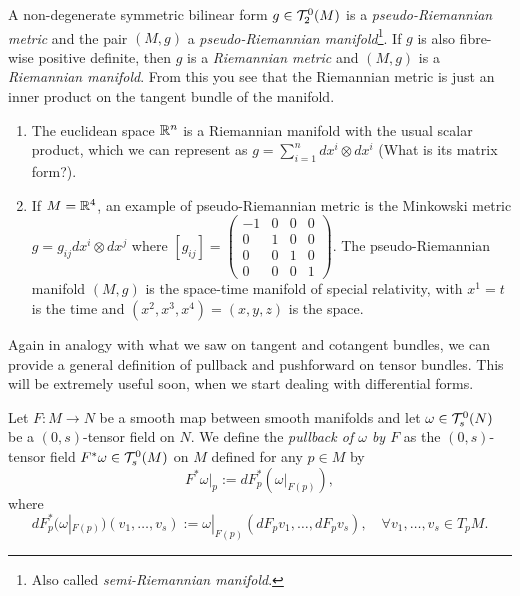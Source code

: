 \begin{example}
  A non-degenerate symmetric bilinear form $g\in \mathcal{T}_2^0(M)$ is a \emph{pseudo-Riemannian metric} and the pair $(M,g)$ a \emph{pseudo-Riemannian manifold}\footnote{Also called \emph{semi-Riemannian manifold}.}.
  If $g$ is also fibre-wise positive definite, then $g$ is a \emph{Riemannian metric} and $(M,g)$ is a \emph{Riemannian manifold}.
  From this you see that the Riemannian metric is just an inner product on the tangent bundle of the manifold.

  \begin{enumerate}
    \item The euclidean space $\mathbb{R}^n$ is a Riemannian manifold with the usual scalar product, which we can represent as $g = \sum_{i=1}^n dx^i\otimes dx^i$ (What is its matrix form?).
    \item If $M=\mathbb{R}^4$, an example of pseudo-Riemannian metric is the Minkowski metric $g = g_{ij} dx^i\otimes dx^j$ where $[g_{ij}] = {\left(\begin{smallmatrix} -1 & 0 & 0 & 0\\ 0 & 1 & 0 & 0 \\ 0 & 0 & 1 & 0 \\ 0 & 0 & 0 & 1 \end{smallmatrix}\right)}$. The pseudo-Riemannian manifold $(M, g)$ is the space-time manifold of special relativity, with $x^1 = t$ is the time and $(x^2, x^3, x^4) = (x,y,z)$ is the space.
  \end{enumerate}
\end{example}

Again in analogy with what we saw on tangent and cotangent bundles, we can provide a general definition of pullback and pushforward on tensor bundles.
This will be extremely useful soon, when we start dealing with differential forms.

\begin{definition}
  Let $F:M\to N$ be a smooth map between smooth manifolds and let $\omega \in \mathcal{T}_s^0(N)$ be a $(0,s)$-tensor field on $N$. We define the \emph{pullback of $\omega$ by $F$} as the $(0,s)$-tensor field $F^*\omega \in \mathcal{T}_s^0(M)$ on $M$ defined for any $p\in M$ by
  \begin{equation}
    F^*\omega|_p := dF^*_p(\omega|_{F(p)}),
  \end{equation}
  where
  \begin{equation}
    dF^*_p(\omega|_{F(p)})(v_1, \ldots, v_s) := \omega|_{F(p)} (dF_p v_1, \ldots, dF_p v_s), \quad\forall v_1, \ldots, v_s \in T_p M.
  \end{equation}
\end{definition}


